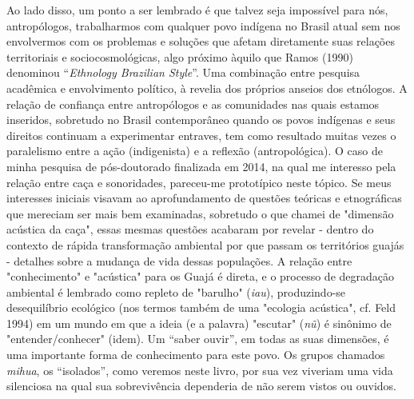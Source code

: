 Ao lado disso, um ponto a ser lembrado é que talvez seja impossível para
nós, antropólogos, trabalharmos com qualquer povo indígena no Brasil
atual sem nos envolvermos com os problemas e soluções que afetam
diretamente suas relações territoriais e sociocosmológicas, algo próximo
àquilo que Ramos (1990) denominou ``\emph{Ethnology Brazilian Style}''.
Uma combinação entre pesquisa acadêmica e envolvimento político, à
revelia dos próprios anseios dos etnólogos. A relação de confiança entre
antropólogos e as comunidades nas quais estamos inseridos, sobretudo no
Brasil contemporâneo quando os povos indígenas e seus direitos continuam
a experimentar entraves, tem como resultado muitas vezes o paralelismo
entre a ação (indigenista) e a reflexão (antropológica). O caso de minha
pesquisa de pós-doutorado finalizada em 2014, na qual me interesso pela
relação entre caça e sonoridades, pareceu-me prototípico neste tópico.
Se meus interesses iniciais visavam ao aprofundamento de questões
teóricas e etnográficas que mereciam ser mais bem examinadas, sobretudo
o que chamei de "dimensão acústica da caça", essas mesmas questões
acabaram por revelar - dentro do contexto de rápida transformação
ambiental por que passam os territórios guajás - detalhes sobre a
mudança de vida dessas populações. A relação entre "conhecimento" e
"acústica" para os Guajá é direta, e o processo de degradação ambiental
é lembrado como repleto de "barulho" (\emph{iau}), produzindo-se
desequilíbrio ecológico (nos termos também de uma "ecologia acústica",
cf. Feld 1994) em um mundo em que a ideia (e a palavra) "escutar"
(\emph{nũ}) é sinônimo de "entender/conhecer" (idem). Um ``saber
ouvir'', em todas as suas dimensões, é uma importante forma de
conhecimento para este povo. Os grupos chamados \emph{mihua}, os
``isolados'', como veremos neste livro, por sua vez viveriam uma vida
silenciosa na qual sua sobrevivência dependeria de não serem vistos ou
ouvidos.

